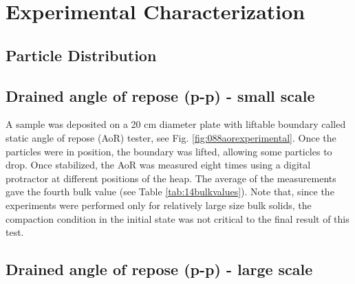 
\chapter[Experimental Characterization]{Experimental Characterization}
\label{cap:experimentalcharacterization}






\section{Particle Distribution}
\label{sec:particledistribution}


\section{Drained angle of repose (p-p) - small scale}
\label{sec:aor}

A sample was deposited on a 20 cm diameter plate with liftable
boundary called static angle of repose (\acs{AoR}) tester, see Fig. \ref{fig:088aorexperimental}.
Once the particles were in position, the boundary was lifted, allowing some particles to drop. 
Once stabilized, the \acs{AoR} was measured eight times using a digital protractor at different positions of the heap. 
The average of the measurements gave the fourth bulk value (see Table
\ref{tab:14bulkvalues}).
Note that, since the experiments were performed only for relatively large size
bulk solids, the compaction condition in the initial state was not critical to the
final result of this test.\\


\section{Drained angle of repose (p-p) - large scale}
\label{sec:aorlargescale}

